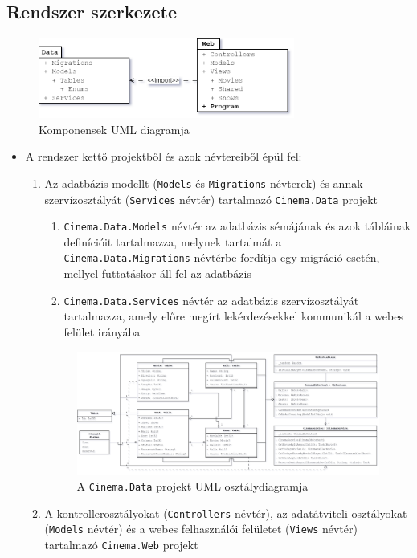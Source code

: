 \documentclass{article}
\begin{document}
	\subsection*{Rendszer szerkezete}
	\begin{figure}[H]
		\centering
		\includegraphics[width=0.75\textwidth]{component}
		\caption{Komponensek UML diagramja}
	\end{figure}
	\begin{itemize}
		\item A rendszer kettő projektből és azok névtereiből épül fel:
		\begin{enumerate}
			\item Az adatbázis modellt (\texttt{Models} és \texttt{Migrations} névterek) és annak szervízosztályát (\texttt{Services} névtér) tartalmazó \texttt{Cinema.Data} projekt
			\begin{enumerate}
				\item \texttt{Cinema.Data.Models} névtér az adatbázis sémájának és azok tábláinak definícióit tartalmazza, melynek tartalmát a \texttt{Cinema.Data.Migrations} névtérbe fordítja egy migráció esetén, mellyel futtatáskor áll fel az adatbázis
				\item \texttt{Cinema.Data.Services} névtér az adatbázis szervízosztályát tartalmazza, amely előre megírt lekérdezésekkel kommunikál a webes felület irányába
			\end{enumerate}
			\begin{figure}[H]
				\centering
				\includegraphics[width=1\textwidth]{data}
				\caption{A \texttt{Cinema.Data} projekt UML osztálydiagramja}
			\end{figure}\newpage
			\item A kontrollerosztályokat (\texttt{Controllers} névtér), az adatátviteli osztályokat (\texttt{Models} névtér) és a webes felhasználói felületet (\texttt{Views} névtér) tartalmazó \texttt{Cinema.Web} projekt

\end{enumerate}
\end{itemize}
\end{document}
